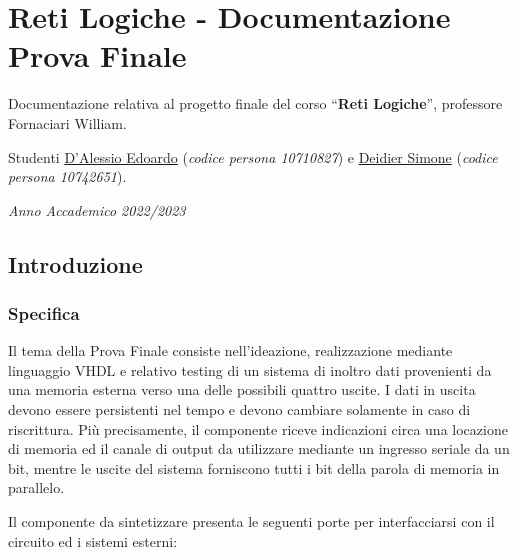 \pagebreak

\hypertarget{reti-logiche---documentazione-prova-finale}{%
\section{Reti Logiche - Documentazione Prova
Finale}\label{reti-logiche---documentazione-prova-finale}}

Documentazione relativa al progetto finale del corso ``\textbf{Reti
Logiche}'', professore Fornaciari William.

Studenti \href{https://github.com/EdoardoDAlessio}{D'Alessio Edoardo}
(\emph{codice persona 10710827}) e
\href{https://github.com/SimoneDeidier}{Deidier Simone} (\emph{codice
persona 10742651}).\newline\newline\newline

\emph{Anno Accademico 2022/2023}

\pagebreak

\hypertarget{introduzione}{%
\subsection{Introduzione}\label{introduzione}}

\hypertarget{specifica}{%
\subsubsection{Specifica}\label{specifica}}

Il tema della Prova Finale consiste nell'ideazione, realizzazione
mediante linguaggio VHDL e relativo testing di un sistema di inoltro
dati provenienti da una memoria esterna verso una delle possibili
quattro uscite. I dati in uscita devono essere persistenti nel tempo e
devono cambiare solamente in caso di riscrittura. Più precisamente, il
componente riceve indicazioni circa una locazione di memoria ed il
canale di output da utilizzare mediante un ingresso seriale da un bit,
mentre le uscite del sistema forniscono tutti i bit della parola di
memoria in parallelo.

Il componente da sintetizzare presenta le seguenti porte per
interfacciarsi con il circuito ed i sistemi esterni:

